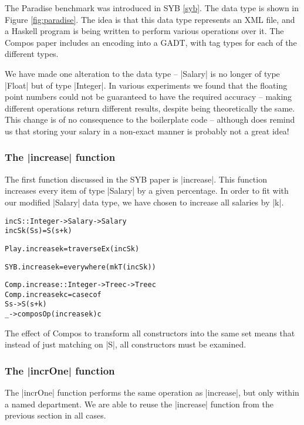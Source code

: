 \documentclass[preprint]{sigplanconf}
\newenvironment{code}{\begin{alltt}\small}{\end{alltt}}
\begin{document}
The Paradise benchmark was introduced in SYB \ref{syb}. The data type is shown in Figure \ref{fig:paradise}. The idea is that this data type represents an XML file, and a Haskell program is being written to perform various operations over it. The Compos paper includes an encoding into a GADT, with tag types for each of the different types.

We have made one alteration to the data type -- |Salary| is no longer of type |Float| but of type |Integer|. In various experiments we found that the floating point numbers could not be guaranteed to have the required accuracy -- making different operations return different results, despite being theoretically the same. This change is of no consequence to the boilerplate code -- although does remind us that storing your salary in a non-exact manner is probably not a great idea!

\subsubsection{The |increase| function}

The first function discussed in the SYB paper is |increase|. This function increases every item of type |Salary| by a given percentage. In order to fit with our modified |Salary| data type, we have chosen to increase all salaries by |k|.

\begin{code}
incS :: Integer -> Salary -> Salary
incS k (S s) = S (s + k)

Play.increase k = traverseEx (incS k)

SYB.increase k = everywhere (mkT (incS k))

Comp.increase :: Integer -> Tree c -> Tree c
Comp.increase k c = case c of
    S s -> S (s + k)
    _ -> composOp (increase k) c
\end{code}

The effect of Compos to transform all constructors into the same set means that instead of just matching on |S|, all constructors must be examined.

\subsubsection{The |incrOne| function}

The |incrOne| function performs the same operation as |increase|, but only within a named department. We are able to reuse the |increase| function from the previous section in all cases.
\end{document}
